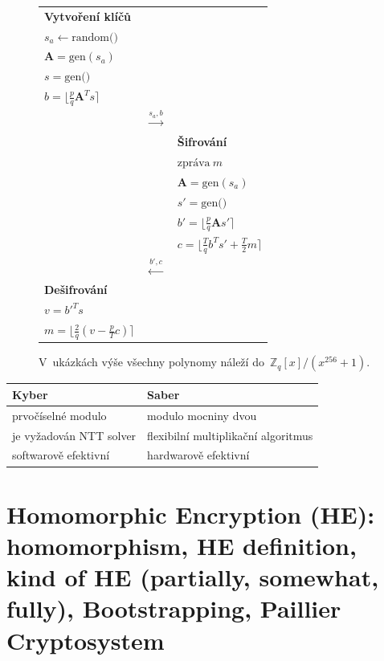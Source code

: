 \begin{figure}[ht]
\begin{minipage}[t]{0.5\textwidth}
        \begin{tabular}{lcl}
        \textbf{Vytvoření klíčů} && \\
        $s_a \leftarrow \text{random()}$ && \\
        $\textbf{A} = \text{gen}(s_a)$ && \\
        $s = \text{gen()}$ && \\
        $b = \lfloor \frac{p}{q} \textbf{A}^T s \rceil$ && \\
        & $\stackrel{s_a, b}{\longrightarrow}$ & \\
        && \textbf{Šifrování} \\
        && $\text{zpráva}\ m$ \\
        && $\textbf{A} = \text{gen}(s_a)$ \\
        && $s' = \text{gen()}$ \\
        && $b' =\lfloor \frac{p}{q} \textbf{A} s' \rceil$ \\
        && $c = \lfloor \frac{T}{q} b^T s' + \frac{T}{2} m \rceil$ \\
        & $\stackrel{b', c}{\longleftarrow}$ & \\
        \textbf{Dešifrování} && \\
        $v = b'^T s$ && \\
        $m = \lfloor \frac{2}{q} (v - \frac{p}{T} c) \rceil$ && \\
        \end{tabular}
    \end{minipage}

    \vspace*{1em}
    V~ukázkách výše všechny polynomy náleží do~$\mathbb{Z}_q[x]/(x^{256}+1)$.
\end{figure}

\begin{table}[ht]
    \centering
    \begin{tabular}{|l|l|}
    \textbf{Kyber} & \textbf{Saber} \\
    \hline \hline
    prvočíselné modulo & modulo mocniny dvou \\
    je vyžadován NTT solver & flexibilní multiplikační algoritmus \\
    softwarově efektivní & hardwarově efektivní \\
    \end{tabular}
\end{table}


\clearpage
\section{Homomorphic Encryption (HE): homomorphism, HE definition, kind of HE (partially, somewhat, fully), Bootstrapping, Paillier Cryptosystem}

